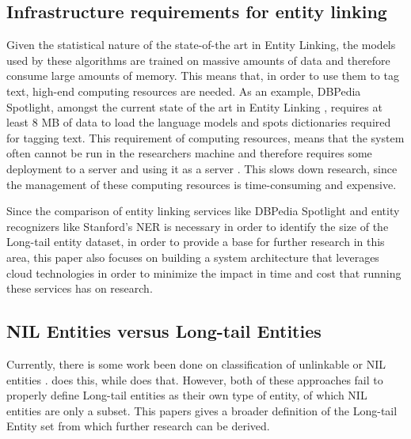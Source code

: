 \subsection{Infrastructure requirements for entity linking}
Given the statistical nature of the state-of-the art in Entity Linking, the models used by these algorithms are trained on massive amounts of data and therefore consume large amounts of memory.
This means that, in order to use them to tag text, high-end computing resources are needed.
As an example, DBPedia Spotlight, amongst the current state of the art in Entity Linking \cite{rizzo2012nerd},
requires at least 8 MB of data \cite{rw_elo_isem2013daiber} to load the language models and spots dictionaries required for tagging text.
This requirement of computing resources, means that the system often cannot be run in the researchers machine
and therefore requires some deployment to a server and using it as a server \cite{rw_elo_spotlightwebservice}.
This slows down research, since the management of these computing resources is time-consuming and expensive.

Since the comparison of entity linking services like DBPedia Spotlight and entity recognizers like Stanford's NER
is necessary in order to identify the size of the Long-tail entity dataset,
in order to provide a base for further research in this area, this paper also focuses on building a system architecture that leverages cloud technologies in order to minimize the impact in time and cost that running these services has on research. 

\subsection{NIL Entities versus Long-tail Entities}\label{nilvslongtail}
Currently, there is some work been done on classification of unlinkable or NIL entities \cite{someone}.
\cite{someone} does this, while \cite{someone} does that.
However, both of these approaches fail to properly define Long-tail entities as their own type of entity, of which NIL entities are only a subset.
This papers gives a broader definition of the Long-tail Entity set from which further research can be derived. 

